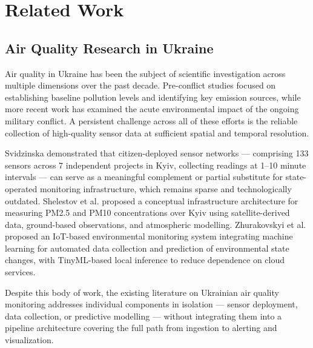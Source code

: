 \chapter{Related Work}

\section{Air Quality Research in Ukraine}

Air quality in Ukraine has been the subject of scientific investigation across multiple dimensions over the past decade. Pre-conflict studies focused on establishing baseline pollution levels and identifying key emission sources\cite{shelestov2020essential, svidzinska2020citizen}, while more recent work has examined the acute environmental impact of the ongoing military conflict\cite{MALYTSKA2026108959}. A persistent challenge across all of these efforts is the reliable collection of high-quality sensor data at sufficient spatial and temporal resolution.

Svidzinska\cite{svidzinska2020citizen} demonstrated that citizen-deployed sensor networks — comprising 133 sensors across 7 independent projects in Kyiv, collecting readings at 1–10 minute intervals — can serve as a meaningful complement or partial substitute for state-operated monitoring infrastructure, which remains sparse and technologically outdated\cite{pehchevski2020ukraine}. Shelestov et al.\cite{shelestov2020essential} proposed a conceptual infrastructure architecture for measuring PM2.5 and PM10 concentrations over Kyiv using satellite-derived data, ground-based observations, and atmospheric modelling. Zhurakovskyi et al.\cite{zhurakovskyi2025ml} proposed an IoT-based environmental monitoring system integrating machine learning for automated data collection and prediction of environmental state changes, with TinyML-based local inference to reduce dependence on cloud services.

Despite this body of work, the existing literature on Ukrainian air quality monitoring addresses individual components in isolation — sensor deployment, data collection, or predictive modelling — without integrating them into a pipeline architecture covering the full path from ingestion to alerting and visualization.

